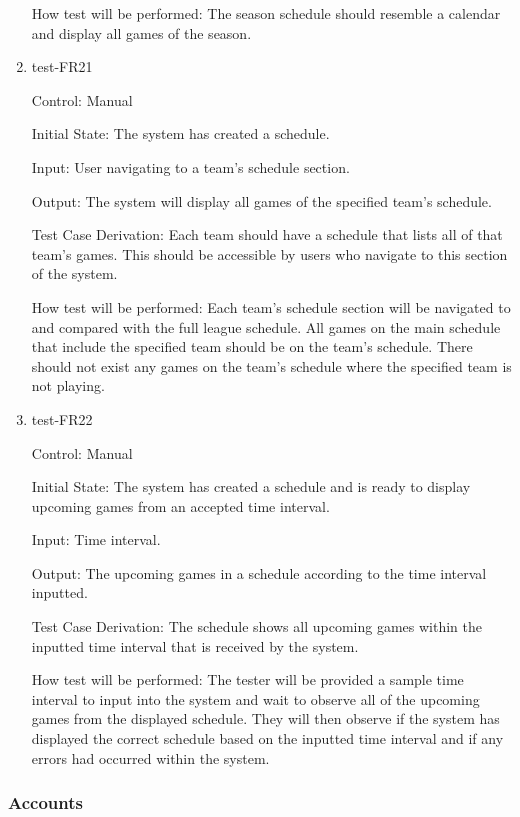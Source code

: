 \documentclass[12pt, titlepage]{article}
\begin{document}
\begin{enumerate}
  How test will be performed: The season schedule should resemble a calendar and display all games of the season.

  \item{test-FR21\\}

  Control: Manual

  Initial State: The system has created a schedule.

  Input: User navigating to a team's schedule section.

  Output: The system will display all games of the specified team's schedule.

  Test Case Derivation: Each team should have a schedule that lists all of
  that team's games. This should be accessible by users who navigate to this
  section of the system.

  How test will be performed: Each team's schedule section will be navigated to
  and compared with the full league schedule. All games on the main schedule
  that include the specified team should be on the team's schedule. There should
  not exist any games on the team's schedule where the specified team is not
  playing.

  \item{test-FR22\\}

  Control: Manual

  Initial State: The system has created a schedule and is ready to display upcoming games from
  an accepted time interval.

  Input: Time interval.

  Output: The upcoming games in a schedule according to the time interval inputted.

  Test Case Derivation: The schedule shows all upcoming games within the inputted time interval
  that is received by the system.

  How test will be performed: The tester will be provided a sample time interval to input
  into the system and wait to observe all of the upcoming games from the displayed schedule.
  They will then observe if the system has displayed the correct schedule based on the
  inputted time interval and if any errors had occurred within the system. 

\end{enumerate}

\subsubsection{Accounts}
\end{document}
